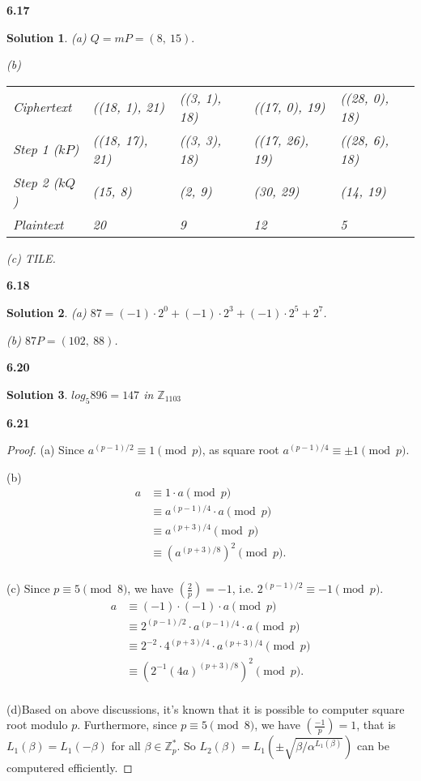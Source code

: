 \documentclass[12pt,a4paper]{article}
\theoremstyle{solution}
\newtheorem*{sol}{Solution}
\begin{document}
\textbf{6.17}

\begin{sol}
(a) $Q=mP=(8,~15).$

(b)

\begin{tabular}{lllll}
Ciphertext   & ((18, 1), 21) & ((3, 1), 18) & ((17, 0), 19) & ((28, 0), 18)\\
Step 1 ($kP$)& ((18, 17), 21) & ((3, 3), 18) & ((17, 26), 19) & ((28, 6), 18)\\
Step 2 ($kQ$)& (15, 8)  & (2, 9) & (30, 29) & (14, 19)\\
Plaintext    &  20 & 9 & 12 & 5\\
\end{tabular}

(c) TILE.
\end{sol}

\textbf{6.18}

\begin{sol}
(a) $87=(-1)\cdot 2^0+(-1)\cdot 2^3+(-1)\cdot 2^5+2^7$.

(b) $87P=(102,~88)$.
\end{sol}

\textbf{6.20}

\begin{sol}
$log_5 896=147$ in $\mathbb{Z}_{1103}$
\end{sol}


\textbf{6.21}

\begin{proof}
(a) Since $a^{(p-1)/2} \equiv 1 \pmod{p}$, as square root $a^{(p-1)/4} \equiv \pm 1 \pmod{p}$.

(b)
\begin{align*}
 a & \equiv 1 \cdot a \pmod{p}\\
   & \equiv a^{(p-1)/4} \cdot a \pmod{p}\\
   & \equiv a^{(p+3)/4} \pmod{p}\\
   & \equiv (a^{(p+3)/8})^2 \pmod{p}.\\
\end{align*}

(c) Since $p \equiv 5 \pmod{8}$, we have $\left( \frac{2}{p}\right) =-1$, i.e. $2^{(p-1)/2} \equiv -1 \pmod{p}$.
\begin{align*}
 a & \equiv (-1)\cdot (-1) \cdot a \pmod{p}\\
   & \equiv 2^{(p-1)/2} \cdot a^{(p-1)/4} \cdot a \pmod{p}\\
   & \equiv 2^{-2} \cdot 4^{(p+3)/4} \cdot a^{(p+3)/4} \pmod{p}\\
   & \equiv (2^{-1}(4a)^{(p+3)/8})^2 \pmod{p}.\\
\end{align*}

(d)Based on above discussions, it's known that it is possible to computer square root modulo $p$. Furthermore, since $p\equiv 5 \pmod{8}$, we have $\left( \frac{-1}{p}\right) =1$, that is $L_1(\beta)=L_1(-\beta)$ for all $\beta \in \mathbb{Z}_p ^*$. So $L_2(\beta)=L_1(\pm \sqrt{\beta/\alpha^{L_1(\beta)}})$ can be computered efficiently.
\end{proof}
\end{document}
